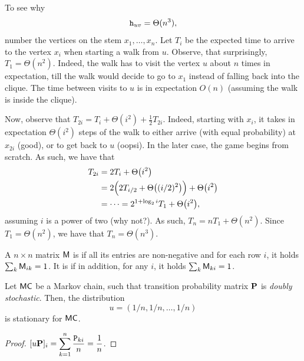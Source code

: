 \begin{example}
    To see why
    \[
    \mathtt{h}_{uv} = \Theta (n^3),
    \]
    number the vertices on the stem $x_1, \ldots, x_n$. Let $T_i$ be the expected time to
    arrive to the vertex $x_i$ when starting a walk from $u$. Observe,
    that surprisingly, $T_1 = \Theta( n^2 )$. Indeed, the walk has to
    visit the vertex $u$ about $n$ times in expectation, till the walk
    would decide to go to $x_1$ instead of falling back into the
    clique. The time between visits to $u$ is in expectation $O(n)$
    (assuming the walk is inside the clique).
    
    Now, observe that $T_{2i} = T_i + \Theta(i^2) + \frac{1}{2}
    T_{2i}$. Indeed, starting with $x_i$, it takes in expectation
    $\Theta(i^2)$ steps of the walk to either arrive (with equal
    probability) at $x_{2i}$ (good), or to get back to $u$
    (\si{oopsi}). In the later case, the game begins from scratch. As
    such, we have that
    \begin{align*}
      T_{2i}%
      &=%
      2T_i + \Theta\pth{ i^2}%
      \\ &=%
      2\pth[]{\Big. 2T_{i/2} + \Theta\pth{ (i/2)^2}}%
      + \Theta\pth{ i^2}%
      \\ &=%
      \cdots = 2^{1 + \log_2 i}T_1 + \Theta\pth{ i^2 },
    \end{align*}
    assuming $i$ is a power of two (why not?). As such, $T_n = nT_1 +
    \Theta(n^2 )$. Since $T_1 = \Theta(n^2)$, we have that $T_n =
    \Theta(n^3)$.
\end{example}

\begin{defn}
    A $n \times n$ matrix $\mathsf{M}$ is  if all its
    entries are non-negative and for each row $i$, it holds $\sum_{k}
    \mathsf{M}_{ik} =1$. It is  if in addition,
    for any $i$, it holds $\sum_{k} \mathsf{M}_{ki} =1$.
\end{defn}

\begin{lemma}
    Let $\mathsf{MC}$ be a Markov chain, such that transition probability
    matrix $\mathbf{P}$ is \emph{doubly stochastic}. Then, the
    distribution
    \[
    u = (1/n, 1/n,\ldots, 1/n)
    \]
    is stationary for $\mathsf{MC}$.
    
\end{lemma}

\begin{proof}
    $\displaystyle [u \mathbf{P}]_i = \sum_{k=1}^n
    \frac{\mathtt{P}_{ki}}{n} = \frac{1}{n}$.
\end{proof}

